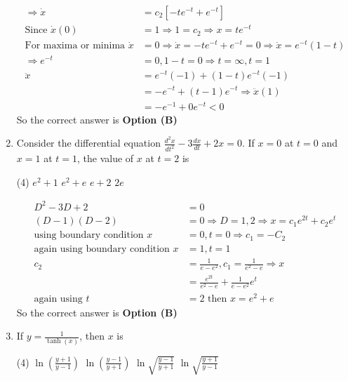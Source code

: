 \begin{enumerate}[label=\color{ocre}\textbf{\arabic*.}]
\begin{answer}
\begin{align*}
		\Rightarrow \dot{x}&=c_{2}\left[-t e^{-t}+e^{-t}\right]\\
		\text{Since }\dot{x}(0)&=1 \Rightarrow 1=c_{2} \Rightarrow x=t e^{-t}\\
		\text{For maxima or minima }\dot{x}&=0 \Rightarrow \dot{x}=-t e^{-t}+e^{-t}=0 \Rightarrow \dot{x}=e^{-t}(1-t)\\
		\Rightarrow e^{-t}&=0,1-t=0 \Rightarrow t=\infty, t=1\\
		\ddot{x}&=e^{-t}(-1)+(1-t) e^{-t}(-1)\\&=-e^{-t}+(t-1) e^{-t} \Rightarrow \ddot{x}(1)\\&=-e^{-1}+0 e^{-t}<0
		\end{align*}
		So the correct answer is \textbf{Option (B)}
	\end{answer}
	\item Consider the differential equation $\frac{d^{2} x}{d t^{2}}-3 \frac{d x}{d t}+2 x=0$. If $x=0$ at $t=0$ and $x=1$ at $t=1$, the value of $x$ at $t=2$ is
	{}
	\begin{tasks}(4)
		\task[\textbf{A.}] $e^{2}+1$
		\task[\textbf{B.}] $e^{2}+e$
		\task[\textbf{C.}] $e+2$
		\task[\textbf{D.}] $2 e$
	\end{tasks}
	\begin{answer}
		\begin{align*}
		D^{2}-3 D+2&=0\\
		(D-1)(D-2)&=0 \Rightarrow D=1,2 \Rightarrow x=c_{1} e^{2 t}+c_{2} e^{t}\\
		\text{using boundary condition }x&=0, t=0 \Rightarrow c_{1}=-C_{2}\\
		\text{again using boundary condition }x&=1, t=1\\
		c_{2}&=\frac{1}{e-e^{2}}, c_{1}=\frac{1}{e^{2}-e} \Rightarrow x\\&=\frac{e^{2 t}}{e^{2}-e}+\frac{1}{e-e^{2}} e^{t}\\
		\text{again using }t&=2\text{ then }x=e^{2}+e
		\end{align*}
		So the correct answer is \textbf{Option (B)}
	\end{answer}
	\item  If $y=\frac{1}{\tanh (x)}$, then $x$ is
	{}
	\begin{tasks}(4)
		\task[\textbf{A.}] $\ln \left(\frac{y+1}{y-1}\right)$
		\task[\textbf{B.}] $\ln \left(\frac{y-1}{y+1}\right)$
		\task[\textbf{C.}]  $\ln \sqrt{\frac{y-1}{y+1}}$
		\task[\textbf{D.}]  $\ln \sqrt{\frac{y+1}{y-1}}$
	\end{tasks}

\end{enumerate}
